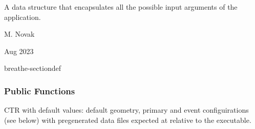 \documentclass[letterpaper,10pt,english]{sphinxmanual}
\begin{document}
\begin{sphinxVerbatim}[commandchars=\\\{\}]
                          
      
\end{sphinxVerbatim}

\begin{fulllineitems}
\label{\detokenize{Simulation/SimulationCodeDoc:_CPPv415InputParameters}}
\pysigstartsignatures
\pysigstartmultiline
{}
\pysigstopmultiline
\pysigstopsignatures
\sphinxAtStartPar
A data structure that encapsulates all the possible input arguments of the  application. 

\sphinxAtStartPar
\begin{description}
\sphinxAtStartPar
M. Novak 

\sphinxAtStartPar
Aug 2023 

\end{description}


\begin{sphinxuseclass}{breathe-sectiondef}\subsubsection*{Public Functions}

\begin{fulllineitems}
\label{\detokenize{Simulation/SimulationCodeDoc:_CPPv4N15InputParameters15InputParametersEv}}
\pysigstartsignatures
\pysigstartmultiline
{}
\pysigstopmultiline
\pysigstopsignatures
\sphinxAtStartPar
CTR with default values: default geometry, primary and event configuirations (see below) with pre\sphinxhyphen{}generated data files expected at  relative to the  executable. 


\end{fulllineitems}
\end{sphinxuseclass}
\end{fulllineitems}
\end{document}
